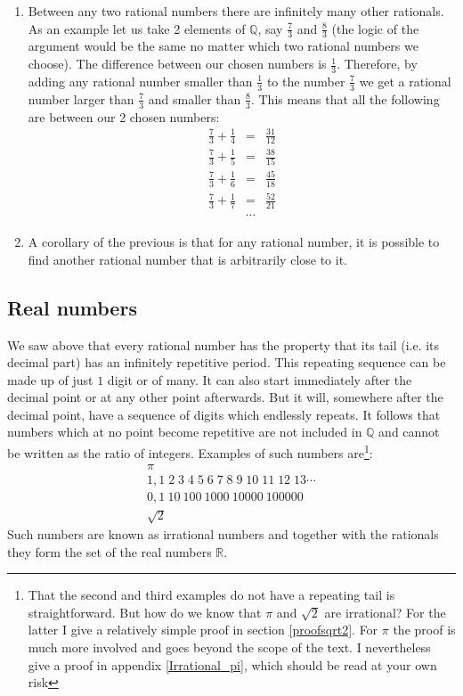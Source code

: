 \begin{enumerate}
	\item Between any two rational numbers there are infinitely many other rationals. As an example let us take 2 elements of $\mathbb{Q}$, say $\frac{7}{3}$ and $\frac{8}{3}$ (the logic of the argument would be the same no matter which two rational numbers we choose). The difference between our chosen numbers is $\frac{1}{3}$. Therefore, by adding any rational number smaller than $\frac{1}{3}$ to the number $\frac{7}{3}$ we get a rational number larger than $\frac{7}{3}$ and smaller than $\frac{8}{3}$. This means that all the following are between our 2 chosen numbers:
	\begin{eqnarray}
	\frac{7}{3} + \frac{1}{4} & = & \frac{31}{12} \nonumber \\
	\frac{7}{3} + \frac{1}{5} & = & \frac{38}{15} \nonumber \\
	\frac{7}{3} + \frac{1}{6} & = & \frac{45}{18} \nonumber \\
	\frac{7}{3} + \frac{1}{7} & = & \frac{52}{21} \nonumber \\
	& \cdots & \nonumber
	\end{eqnarray}
	
	\item A corollary of the previous is that for any rational number, it is possible to find another rational number that is arbitrarily close to it.
	
\end{enumerate}

\subsection{Real numbers}
\label{RealNumbersSet}

\noindent We saw above that every rational number has the property that its tail (i.e. its decimal part) has an infinitely repetitive period. This repeating sequence can be made up of just $1$ digit or of many. It can also start immediately after the decimal point or at any other point afterwards. But it will, somewhere after the decimal point, have a sequence of digits which endlessly repeats. It follows that numbers which at no point become repetitive are not included in $\mathbb{Q}$ and cannot be written as the ratio of integers. Examples of such numbers are\footnote{That the second and third examples do not have a repeating tail is straightforward. But how do we know that $\pi$ and $\sqrt{2}$ are irrational? For the latter I give a relatively simple proof in section \ref{proofsqrt2}. For $\pi$ the proof is much more involved and goes beyond the scope of the text. I nevertheless give a proof in appendix \ref{Irrational_pi}, which should be read at your own risk}:
\begin{gather*}
\pi \\
1,1\;2\; 3\;4\;5\;6\;7\;8\;9\;10\;11\;12\;13\cdots \\
 0,1\:10\:100\:1000\:10000\:100000 \\
 \sqrt{2}
\end{gather*}
\noindent Such numbers are known as irrational numbers and together with the rationals they form the set of the real numbers $\mathbb{R}$.

